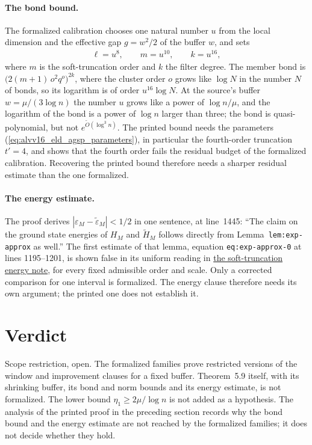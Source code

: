 \documentclass{article}
\begin{document}
\paragraph{The bond bound.} The formalized calibration chooses one natural
number $u$ from the local dimension and the effective gap $g=w^2/2$ of the
buffer $w$, and sets
\begin{align}
 \ell=u^8,\qquad m=u^{10},\qquad k=u^{16},
 \label{eq:alvv16_eld_agsp_calibration}
\end{align}
where $m$ is the soft-truncation order and $k$ the filter degree. The member
bond is $\bigl(2(m+1)\,o^2q^{o}\bigr)^{2k}$, where the cluster order $o$ grows
like $\log N$ in the number $N$ of bonds, so its logarithm is of order
$u^{16}\log N$. At the source's buffer $w=\mu/(3\log n)$ the number $u$ grows
like a power of $\log n/\mu$, and the logarithm of the bond is a power of
$\log n$ larger than three; the bond is quasi-polynomial, but not
$e^{\tilde O(\log^3n)}$. The printed bound needs the parameters
(\ref{eq:alvv16_eld_agsp_parameters}), in particular the fourth-order truncation
$t'=4$, and
 shows that
the fourth order fails the residual budget of the formalized calibration.
Recovering the printed bound therefore needs a sharper residual estimate than
the one formalized.

\paragraph{The energy estimate.} The proof derives
$|\varepsilon_M-\tilde\varepsilon_M|<1/2$ in one sentence, at line~1445:
``The claim on the ground state energies of $H_M$ and $\tilde H_M$ follows
directly from Lemma~\texttt{lem:exp-approx} as well.'' The first estimate of that
lemma, equation \texttt{eq:exp-approx-0} at lines 1195--1201, is shown false in
its uniform reading in
\href{https://sirui-lu.com/TNLean/paper-gaps/alvv16_soft_truncation_energy_estimate.pdf}{the
soft-truncation energy note}, for every fixed admissible order and scale. Only a
corrected comparison for one interval is formalized. The energy clause therefore
needs its own argument; the printed one does not establish it.

\section{Verdict}

Scope restriction, open. The formalized families prove restricted versions of
the window and improvement clauses for a fixed buffer. Theorem~5.9 itself, with
its shrinking buffer, its bond and norm bounds and its energy estimate, is not
formalized. The lower bound $\eta_1\geq2\mu/\log n$ is not added as a
hypothesis. The analysis of the printed proof in the preceding section records
why the bond bound and the energy estimate are not reached by the formalized
families; it does not decide whether they hold.



\end{document}
